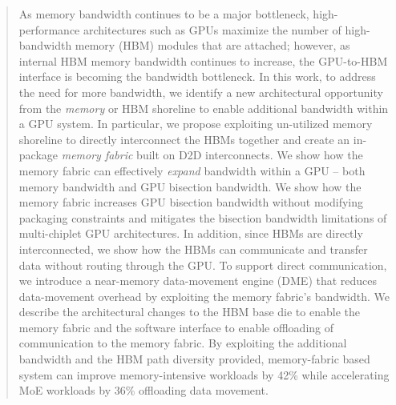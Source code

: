 \begin{abstract}
As memory bandwidth continues to be a major bottleneck, 
high-performance architectures such as GPUs
maximize the number of high-bandwidth memory (HBM) modules that are attached; however, as internal HBM memory bandwidth continues to increase, the GPU-to-HBM interface is becoming the bandwidth bottleneck.  
In this work, to address the need for more bandwidth, we identify a new architectural opportunity from the \emph{memory} or HBM shoreline to enable additional bandwidth within a GPU system.  
In particular, we propose exploiting  un-utilized memory shoreline to directly interconnect the HBMs together and create an in-package \emph{memory fabric} built on D2D interconnects. We show how the memory fabric can effectively \emph{expand} bandwidth within a GPU -- both memory bandwidth and GPU bisection bandwidth.
We show how the memory fabric increases GPU bisection bandwidth without modifying packaging constraints and mitigates the bisection bandwidth limitations of multi-chiplet GPU architectures. In addition, since HBMs are directly interconnected, we show how the HBMs can communicate and transfer data without routing through the GPU. To support direct communication, we introduce a near-memory data-movement engine (DME) that reduces data-movement overhead by exploiting the memory fabric’s bandwidth. 
We describe the architectural changes to the HBM base die to enable the memory fabric and the software interface to enable offloading of communication to the memory fabric.  By exploiting the additional bandwidth and the HBM path diversity provided, memory-fabric based system can improve memory-intensive workloads by 42\% while accelerating MoE workloads by 36\% offloading data movement. 

\end{abstract}